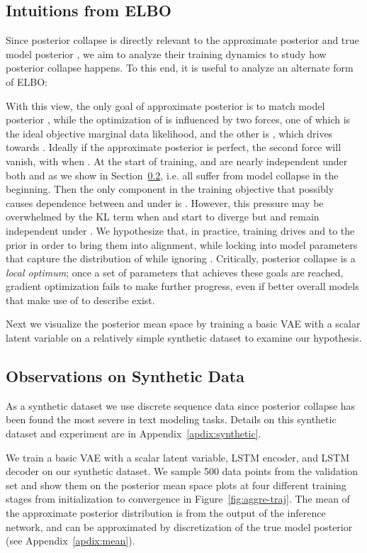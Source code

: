 \documentclass{article} \usepackage{iclr2019_conference,times}
\begin{document}
\subsection{Intuitions from ELBO}
Since posterior collapse is directly relevant to the approximate posterior  and true model posterior , we aim to analyze their training dynamics to study how posterior collapse happens. To this end, it is useful to analyze an alternate form of ELBO:

With this view, the only goal of approximate posterior  is to match model posterior , while the optimization of  is influenced by two forces, one of which is the ideal objective marginal data likelihood, and the other is , which drives  towards . Ideally if the approximate posterior is perfect, the second force will vanish, with  when .
At the start of training,  and  are nearly independent under both  and  as we show in Section~\ref{sec:vanilla-syn}, i.e. all  suffer from model collapse in the beginning.
Then the only component in the training objective that possibly causes dependence between  and  under  is . However, this pressure may be overwhelmed by the KL term when  and  start to diverge but  and  remain independent under . We hypothesize that, in practice, training drives  and  to the prior in order to bring them into alignment, while locking into model parameters that capture the distribution of  while ignoring . Critically, posterior collapse is a \emph{local optimum}; once a set of parameters that achieves these goals are reached, gradient optimization fails to make further progress, even if better overall models that make use of  to describe  exist.

Next we visualize the posterior mean space by training a basic VAE with a scalar latent variable on a relatively simple synthetic dataset to examine our hypothesis.



\subsection{Observations on Synthetic Data}
\label{sec:vanilla-syn}
As a synthetic dataset we use discrete sequence data since posterior collapse has been found the most severe in text modeling tasks.
Details on this synthetic dataset and experiment are in Appendix~\ref{apdix:synthetic}.

We train a basic VAE with a scalar latent variable, LSTM encoder, and LSTM decoder
on our synthetic dataset. We sample 500 data points from the validation set and show them on the posterior mean space plots at four different training stages from initialization to convergence in Figure~\ref{fig:aggre-traj}. The mean of the approximate posterior distribution  is from the output of the inference network, and  can be approximated by discretization of the true model posterior  (see Appendix~\ref{apdix:mean}).
\end{document}
